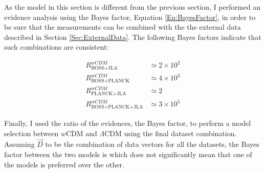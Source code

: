 \qquad As the model in this section is different from the previous section, I performed an evidence analysis using the Bayes factor, Equation \eqref{Eq:BayesFactor}, in order to be sure that the measurements can be combined with the the external data described in Section \ref{Sec:ExternalData}. The following Bayes factors indicate that such combinations are consistent:

\begin{align}
R_{\scriptscriptstyle\text{BOSS+JLA}}^{\textit{w}CDM} & \simeq 2 \times 10^2  \\
R_{\scriptscriptstyle\text{BOSS+PLANCK}}^{\textit{w}CDM} & \simeq 4 \times 10^3 \\
R_{\scriptscriptstyle\text{PLANCK+JLA}}^{\textit{w}CDM} & \simeq 2 \\
R_{\scriptscriptstyle\text{BOSS+PLANCK+JLA}}^{\textit{w}CDM} & \simeq 3 \times 10^5
\end{align}

Finally, I used the ratio of the evidences, the Bayes factor, to perform a model selection between $w$CDM and $\Lambda$CDM using the final dataset combination. Assuming $\vec{D}$ to be the combination of data vectors for all the datasets, the Bayes factor between the two models is
which does not significantly mean that one of the models is preferred over the other.

